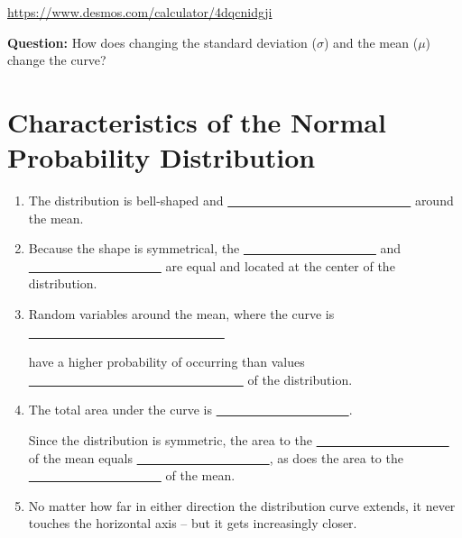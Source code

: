 \documentclass[12pt, letterpaper]{article}
\newcounter{visualconnection}
\theoremstyle{definition}
\begin{document}
\begin{visualconnection}
\begin{center}
\href{https://www.desmos.com/calculator/4dqcnidgji}{https://www.desmos.com/calculator/4dqcnidgji}
\end{center}

\textbf{Question:}  How does changing the standard deviation ($\sigma$) and the mean ($\mu$) change the curve?

\vspace*{1.5in}

\end{visualconnection}


\section*{Characteristics of the Normal Probability Distribution}

\begin{enumerate}

\item The distribution is bell-shaped and \underline{~~~~~~~~~~~~~~~~~~~~~~~~~~~~~} around the mean.

\vspace*{.2in}

\item Because the shape is symmetrical, the \underline{~~~~~~~~~~~~~~~~~~~~~} and \underline{~~~~~~~~~~~~~~~~~~~~~} are equal and located at the center of the distribution.


\vspace*{.2in}

\item Random variables around the mean, where the curve is \underline{~~~~~~~~~~~~~~~~~~~~~~~~~~~~~~~} 

\vspace*{.1in}
have a higher probability of occurring than values \underline{~~~~~~~~~~~~~~~~~~~~~~~~~~~~~~~~~~} of the distribution.

\vspace*{.2in}

\item The total area under the curve is \underline{~~~~~~~~~~~~~~~~~~~~~}.

Since the distribution is symmetric, the area to the \underline{~~~~~~~~~~~~~~~~~~~~~} of the mean equals \underline{~~~~~~~~~~~~~~~~~~~~~}, as does the area to the \underline{~~~~~~~~~~~~~~~~~~~~~} of the mean.

\vspace*{.2in}

\item No matter how far in either direction the distribution curve extends, it never touches the horizontal axis -- but it gets increasingly closer.


\end{enumerate}
\end{document}
